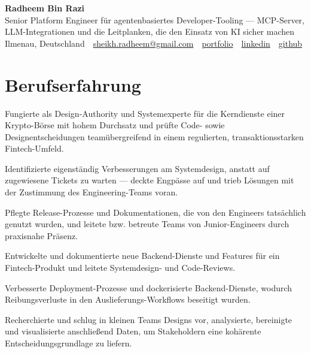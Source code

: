 \documentclass[11pt,a4paper]{resume}
\makeatletter
\newcommand{\Portfolio}{https://radheem.github.io/my-cv}
\newcommand{\PortfolioText}{portfolio}
\newcommand{\GitHub}{https://github.com/radheem}
\newcommand{\LinkedIn}{https://www.linkedin.com/in/radheem-razi}
\newcommand{\Email}{sheikh.radheem@gmail.com}
\makeatother
\begin{document}
\clearpage
{}

\begin{center}
  {\huge\bfseries Radheem Bin Razi}\\[3pt]
  {\large Senior Platform Engineer für agentenbasiertes Developer-Tooling — MCP-Server, LLM-Integrationen und die Leitplanken, die den Einsatz von KI sicher machen}\\[6pt]
  \small
  Ilmenau, Deutschland \,\textbar\,
  \href{mailto:\Email}{\Email} \,\textbar\,
  \href{\Portfolio}{\PortfolioText} \,\textbar\,
  \href{\LinkedIn}{linkedin} \,\textbar\,
  \href{\GitHub}{github}
\end{center}
\vspace{2pt}

\section{Berufserfahrung}

\bullets
  \item Fungierte als Design-Authority und Systemexperte für die Kerndienste einer Krypto-Börse mit hohem Durchsatz und prüfte Code- sowie Designentscheidungen teamübergreifend in einem regulierten, transaktionsstarken Fintech-Umfeld.
  \item Identifizierte eigenständig Verbesserungen am Systemdesign, anstatt auf zugewiesene Tickets zu warten — deckte Engpässe auf und trieb Lösungen mit der Zustimmung des Engineering-Teams voran.
  \item Pflegte Release-Prozesse und Dokumentationen, die von den Engineers tatsächlich genutzt wurden, und leitete bzw. betreute Teams von Junior-Engineers durch praxisnahe Präsenz.
\bulletsend
\vspace{3pt}
\bullets
  \item Entwickelte und dokumentierte neue Backend-Dienste und Features für ein Fintech-Produkt und leitete Systemdesign- und Code-Reviews.
  \item Verbesserte Deployment-Prozesse und dockerisierte Backend-Dienste, wodurch Reibungsverluste in den Auslieferungs-Workflows beseitigt wurden.
\bulletsend
\vspace{3pt}
\bullets
  \item Recherchierte und schlug in kleinen Teams Designs vor, analysierte, bereinigte und visualisierte anschließend Daten, um Stakeholdern eine kohärente Entscheidungsgrundlage zu liefern.
\bulletsend
\vspace{3pt}
\end{document}
